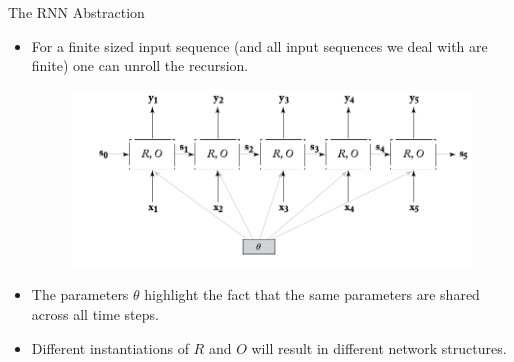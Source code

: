 \documentclass[handout]{beamer}
\begin{document}
\begin{frame}{The RNN Abstraction}
\begin{scriptsize}
\begin{itemize}
\item For a finite sized input sequence (and all input sequences we deal with are finite) one can unroll the recursion.
  \begin{figure}[h]
        	\includegraphics[scale = 0.35]{pics/RNN-unrolled.png}
        \end{figure}

        
\item The parameters $\theta$ highlight the fact that the same parameters are shared across all time steps. 
\item Different instantiations of $R$ and $O$ will result in different network structures.
\end{itemize}
\end{scriptsize}
\end{frame}
\end{document}
